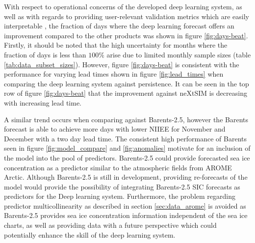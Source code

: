 \documentclass[../main/thesis]{subfiles}
\begin{document}
With respect to operational concerns of the developed deep learning system, as well as with regards to providing user-relevant validation metrics which are easily interpretable \citep{Veland2021}, the fraction of days where the deep learning forecast offers an improvement compared to the other products was shown in figure \ref{fig:days-beat}. Firstly, it should be noted that the high uncertainty for months where the fraction of days is less than $100\%$ arise due to limited monthly sample sizes (table \ref{tab:data_subset_sizes}). However, figure \ref{fig:days-beat} is consistent with the performance for varying lead times shown in figure \ref{fig:lead_times} when comparing the deep learning system against persistence. It can be seen in the top row of figure \ref{fig:days-beat} that the improvement against neXtSIM is decreasing with increasing lead time. 

A similar trend occurs when comparing against Barents-2.5, however the Barents forecast is able to achieve more days with lower NIIEE for November and December with a two day lead time. The consistent high performance of Barents seen in figure \ref{fig:model_compare} and \ref{fig:anomalies} motivate for an inclusion of the model into the pool of predictors. Barents-2.5 could provide forecasted sea ice concentration as a predictor similar to the atmospheric fields from AROME Arctic. Although Barents-2.5 is still in development, providing re-forecasts of the model would provide the possibility of integrating Barents-2.5 SIC forecasts as predictors for the Deep learning system. Furthermore, the problem regarding predictor multicollinearity as described in section \ref{sec:data_arome} is avoided as Barents-2.5 provides sea ice concentration information independent of the sea ice charts, as well as providing data with a future perspective which could potentially enhance the skill of the deep learning system.
\end{document}
